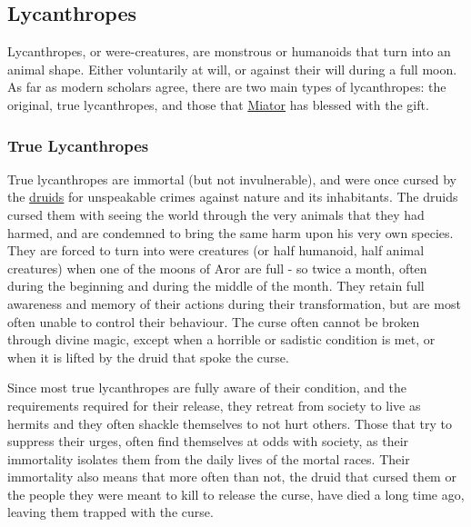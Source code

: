 \subsection{Lycanthropes}
\label{sec:Lycanthropes}

Lycanthropes, or were-creatures, are monstrous or humanoids that turn into an
animal shape. Either voluntarily at will, or against their will during a full
moon. As far as modern scholars agree, there are two main types of
lycanthropes: the original, true lycanthropes, and those that
\hyperref[sec:Three Kings]{Miator} has blessed with the gift.

\subsubsection{True Lycanthropes}
\label{sec:True Lycanthropes}


True lycanthropes are immortal (but not invulnerable), and were once cursed by
the \hyperref[sec:Druids]{druids} for unspeakable crimes against nature and its
inhabitants. The druids cursed them with seeing the world through the very
animals that they had harmed, and are condemned to bring the same harm upon
his very own species. They are forced to turn into were creatures (or half
humanoid, half animal creatures) when one of the moons of Aror are full - so
twice a month, often during the beginning and during the middle of the
month. They retain full awareness and memory of their actions during their
transformation, but are most often unable to control their behaviour. The
curse often cannot be broken through divine magic, except when a horrible or
sadistic condition is met, or when it is lifted by the druid that spoke the
curse.

Since most true lycanthropes are fully aware of their condition, and the
requirements required for their release, they retreat from society to live as
hermits and they often shackle themselves to not hurt others. Those that try
to suppress their urges, often find themselves at odds with society, as their
immortality isolates them from the daily lives of the mortal races. Their
immortality also means that more often than not, the druid that cursed them or
the people they were meant to kill to release the curse, have died a long time
ago, leaving them trapped with the curse.

